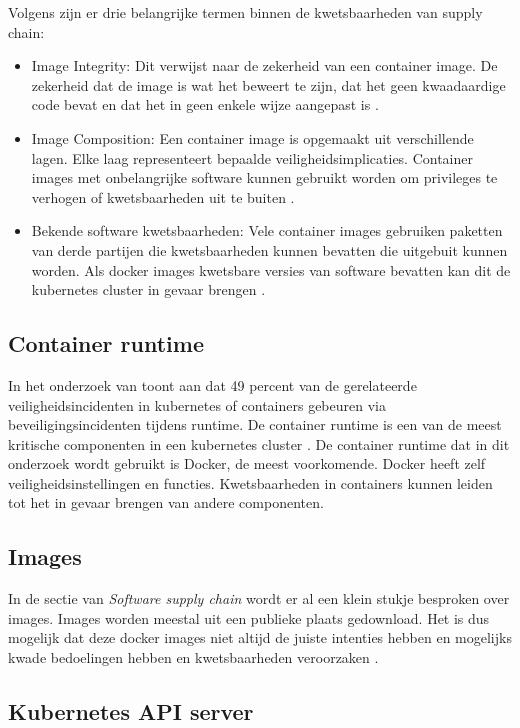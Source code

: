 Volgens \textcite{OWASP-2023} zijn er drie belangrijke termen binnen de kwetsbaarheden van supply chain:
\begin{itemize}
    \item Image Integrity: Dit verwijst naar de zekerheid van een container image. De zekerheid dat de image is wat het beweert te zijn, dat het geen kwaadaardige code bevat en dat het in geen enkele wijze aangepast is \autocite{OWASP-2023}. 
    \item Image Composition: Een container image is opgemaakt uit verschillende lagen. Elke laag representeert bepaalde veiligheidsimplicaties. Container images met onbelangrijke software kunnen gebruikt worden om privileges te verhogen of kwetsbaarheden uit te buiten \autocite{OWASP-2023}. 
    \item Bekende software kwetsbaarheden: Vele container images gebruiken paketten van derde partijen die kwetsbaarheden kunnen bevatten die uitgebuit kunnen worden. Als docker images kwetsbare versies van software bevatten kan dit de kubernetes cluster in gevaar brengen \autocite{OWASP-2023}. 
\end{itemize}


\subsection{Container runtime}
In het onderzoek van \textcite{red-hat-2023} toont aan dat 49 percent van de gerelateerde veiligheidsincidenten in kubernetes of containers gebeuren via beveiligingsincidenten tijdens runtime. De container runtime is een van de meest kritische componenten in een kubernetes cluster \autocite{mytilinakis2020attack}. De container runtime dat in dit onderzoek wordt gebruikt is Docker, de meest voorkomende. Docker heeft zelf veiligheidsinstellingen en functies. Kwetsbaarheden in containers kunnen leiden tot het in gevaar brengen van andere componenten. 

\subsection{Images}
In de sectie van \textit{Software supply chain} wordt er al een klein stukje besproken over images. Images worden meestal uit een publieke plaats gedownload. Het is dus mogelijk dat deze docker images niet altijd de juiste intenties hebben en mogelijks kwade bedoelingen hebben en kwetsbaarheden veroorzaken \autocite{mytilinakis2020attack}. 

\subsection{Kubernetes API server}

